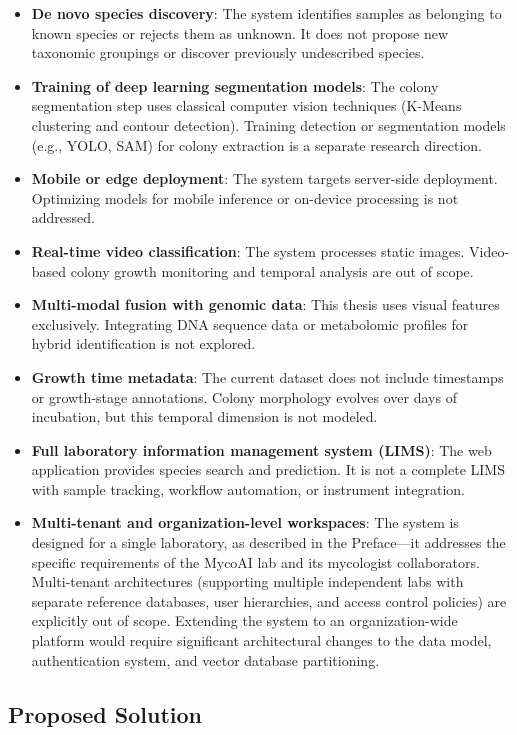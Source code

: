 \begin{itemize}
\item
  \textbf{De novo species discovery}: The system identifies samples as belonging to known species or rejects them as unknown. It does not propose new taxonomic groupings or discover previously undescribed species.
\item
  \textbf{Training of deep learning segmentation models}: The colony segmentation step uses classical computer vision techniques (K-Means clustering and contour detection). Training detection or segmentation models (e.g., YOLO, SAM) for colony extraction is a separate research direction.
\item
  \textbf{Mobile or edge deployment}: The system targets server-side deployment. Optimizing models for mobile inference or on-device processing is not addressed.
\item
  \textbf{Real-time video classification}: The system processes static images. Video-based colony growth monitoring and temporal analysis are out of scope.
\item
  \textbf{Multi-modal fusion with genomic data}: This thesis uses visual features exclusively. Integrating DNA sequence data or metabolomic profiles for hybrid identification is not explored.
\item
  \textbf{Growth time metadata}: The current dataset does not include timestamps or growth-stage annotations. Colony morphology evolves over days of incubation, but this temporal dimension is not modeled.
\item
  \textbf{Full laboratory information management system (LIMS)}: The web application provides species search and prediction. It is not a complete LIMS with sample tracking, workflow automation, or instrument integration.
\item
  \textbf{Multi-tenant and organization-level workspaces}: The system is designed for a single laboratory, as described in the Preface---it addresses the specific requirements of the MycoAI lab and its mycologist collaborators. Multi-tenant architectures (supporting multiple independent labs with separate reference databases, user hierarchies, and access control policies) are explicitly out of scope. Extending the system to an organization-wide platform would require significant architectural changes to the data model, authentication system, and vector database partitioning.
\end{itemize}

\subsection{Proposed Solution}\label{proposed-solution}

